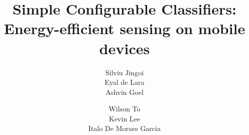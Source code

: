 \documentclass[letterpaper,twocolumn]{acm_proc_article-sp}
\begin{document}
\date{}


\title{Simple Configurable Classifiers: Energy-efficient sensing on mobile devices}


\author{
\alignauthor Silviu Jingoi\\
\alignauthor Eyal de Lara\\
\alignauthor Ashvin Goel\\
\and
\alignauthor Wilson To\\
\alignauthor Kevin Lee\\
\alignauthor Italo De Moraes Garcia\\
}

\maketitle



%









\end{document}
